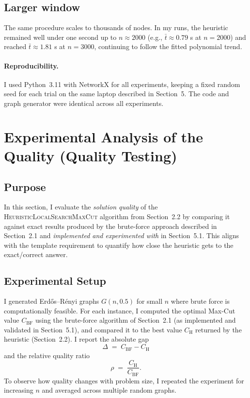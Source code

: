 \documentclass[12pt]{article}
\begin{document}
\subsection{Larger window}
The same procedure scales to thousands of nodes. In my runs, the heuristic remained well
under one second up to \(n\approx 2000\) (e.g., \(\bar t\approx 0.79\) s at \(n=2000\))
and reached \(\bar t\approx 1.81\) s at \(n=3000\), continuing to follow the fitted
polynomial trend.
\paragraph{Reproducibility.}
I used Python~3.11 with NetworkX for all experiments, keeping a fixed random seed for each trial on the same laptop described in Section~5. The code and graph generator were identical across all experiments.

\section{Experimental Analysis of the Quality (Quality Testing)}
\label{sec:quality}

\subsection{Purpose}
In this section, I evaluate the \emph{solution quality} of the \textsc{HeuristicLocalSearchMaxCut} algorithm from Section~2.2 by comparing it against exact results produced by the brute-force approach described in Section~2.1 and \emph{implemented and experimented with} in Section~5.1. This aligns with the template requirement to quantify how close the heuristic gets to the exact/correct answer.

\subsection{Experimental Setup}
I generated Erd\H{o}s--R\'enyi graphs $G(n,0.5)$ for small $n$ where brute force is computationally feasible. For each instance, I computed the optimal Max-Cut value $C_{\text{BF}}$ using the brute-force algorithm of Section~2.1 (as implemented and validated in Section~5.1), and compared it to the best value $C_{\text{H}}$ returned by the heuristic (Section~2.2). I report the absolute gap
\[
\Delta \;=\; C_{\text{BF}} - C_{\text{H}}
\]
and the relative quality ratio
\[
\rho \;=\; \frac{C_{\text{H}}}{C_{\text{BF}}}.
\]
To observe how quality changes with problem size, I repeated the experiment for increasing $n$ and averaged across multiple random graphs.
\end{document}
